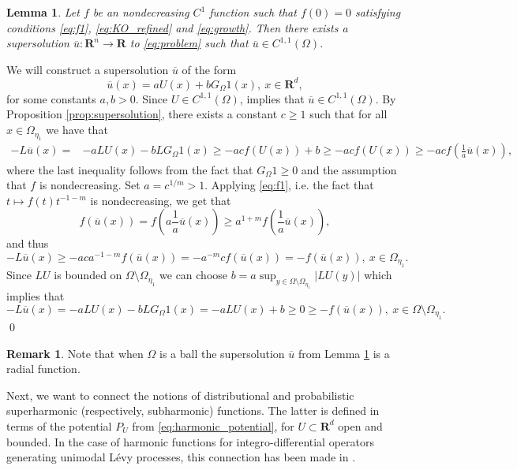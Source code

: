 \documentclass[a4paper,12pt,draft]{article}
\theoremstyle{plain}
\newtheorem{lemma}[thm]{Lemma}
\theoremstyle{definition}
\newtheorem{remark}[thm]{Remark}
\numberwithin{equation}{section}
\newcommand\R{\mathbf{R}}
\renewcommand{\ge}{\geqslant}
\newcommand{\1}{1}
\begin{document}
\begin{lemma}\label{l:supersolution}
Let $f$ be an nondecreasing $C^1$ function such that $f(0)=0$ satisfying conditions \eqref{eq:f1}, \eqref{eq:KO_refined} and \eqref{eq:growth}. 
Then there exists a supersolution $\overline{u}:\R^n\to\R$ to \eqref{eq:problem} such that $\overline{u}\in C^{1,1}(\Omega)$.
\end{lemma}
\proof
We will construct a supersolution $\overline{u}$ of the form
\begin{equation*}
 \overline{u}(x)=aU(x)+bG_\Omega1(x), \ x\in\R^d,
\end{equation*}
for some constants $a,b>0$. Since $U\in C^{1,1}(\Omega)$,  \cite[Theorem 1.2]{GKL} implies that $\overline u\in C^{1,1}(\Omega)$. By Proposition \ref{prop:supersolution}, there exists a constant $c\ge 1$ such that for all $x\in\Omega_{\eta_1}$ we have that
\begin{align*}
-L\overline{u}(x)=&-aLU(x) -bLG_\Omega 1(x)\ge -acf(U(x))+b\ge -acf(U(x))\ge -acf(\tfrac 1 a \overline{u}(x)),
\end{align*}
where the last inequality follows from the fact that $G_\Omega 1\ge 0$ and the assumption that $f$ is nondecreasing. 
Set $a= c^{1/m}>1 $. 
Applying \eqref{eq:f1}, i.e. the fact that $t\mapsto f(t)t^{-1-m}$ is nondecreasing, we get that
$$
f(\overline{u}(x))=f\left(a\frac{1}{a}\overline{u}(x)\right)\ge a^{1+m}f\left(\frac{1}{a}\overline{u}(x)\right),
$$
and thus
$$
-L\overline{u}(x)\ge -ac a^{-1-m}f(\overline{u}(x)) =-a^{-m} cf(\overline{u}(x))=-f(\overline{u}(x)),\ x\in\Omega_{\eta_1}.
$$
Since $LU$ is bounded on $\Omega\setminus\Omega_{\eta_1}$ we can choose $b=a\sup_{y\in \Omega\setminus\Omega_{\eta_1}} |LU(y)|$ which implies that 
\[
-L\overline{u}(x)= -aLU(x)-bLG_\Omega 1(x)=-aLU(x)+b\ge 0\ge -f(\overline{u}(x)),\ x\in \Omega\setminus\Omega_{\eta_1}.
\]
\qed

\begin{remark}
Note that when $\Omega$ is a ball the supersolution $\overline{u}$ from Lemma \ref{l:supersolution} is a radial function. 
\end{remark}

Next, we want to connect the notions of distributional and probabilistic superharmonic (respectively, subharmonic) functions. The latter is defined in terms of the potential $P_U$ from \eqref{eq:harmonic_potential}, for $U\subset \R^d$ open and bounded. In the case of harmonic functions for integro-differential operators generating unimodal L\' evy processes, this connection has been made in \cite{GKL}. 
\end{document}
